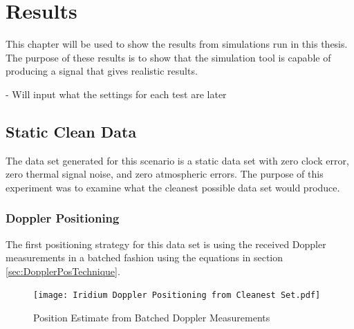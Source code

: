 \documentclass[12pt]{report}
\begin{document}
\chapter{Results}

This chapter will be used to show the results from simulations run in this thesis. The purpose of these results is to show that the simulation tool is capable of producing a signal that gives realistic results. 

- Will input what the settings for each test are later

\section{Static Clean Data}
The data set generated for this scenario is a static data set with zero clock error, zero thermal signal noise, and zero atmospheric errors. The purpose of this experiment was to examine what the cleanest possible data set would produce.  
\subsection{Doppler Positioning}
The first positioning strategy for this data set is using the received Doppler measurements in a batched fashion using the equations in section \ref{sec:DopplerPosTechnique}. 
\begin{figure}[h!]
    \centering
    \texttt{[image: Iridium Doppler Positioning from Cleanest Set.pdf]}
    \caption{Position Estimate from Batched Doppler Measurements}
    \label{fig:cleaniriddopgeo}
\end{figure}
\end{document}
